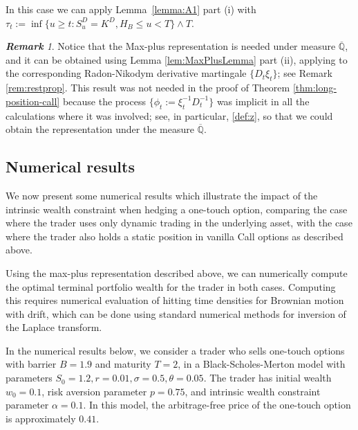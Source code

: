 \documentclass[a4paper]{amsart}
\theoremstyle{definition}
\theoremstyle{remark}
\newtheorem{remark}[theorem]{\textbf{Remark}}
\numberwithin{equation}{section}
\newcommand{\ol}{\overline}
\newcommand{\bQ}{\ol{\mathbb{Q}}}
\begin{document}
In this case we can apply Lemma~\ref{lemma:A1} part (i) with $\tau_t := \inf\{u \ge t : S_u^D = K^D, H_B \le u < T\} \wedge T$.

 \begin{remark}
Notice that  the Max-plus representation is needed  under measure $\bQ$, and it can be obtained using Lemma \ref{lem:MaxPlusLemma} part (ii), applying to the corresponding Radon-Nikodym derivative martingale $\{D_t\xi_t\}$; see Remark \ref{rem:restprop}. This result was not needed in the proof of Theorem \ref{thm:long-position-call}
because the process $\{\phi_t := \xi_t^{-1} D_t^{-1}\}$ was implicit in all the calculations where it was involved; see, in particular,  \ref{def:z}, so that we could obtain the representation under  the measure  $\bQ$.
 
\end{remark}


 


\subsection{Numerical results}

We now present some numerical results which illustrate the impact of the intrinsic wealth constraint when hedging a one-touch option, comparing the case where the trader uses only dynamic trading in the underlying asset, with the case where the trader also holds a static position in vanilla Call options as described above.

Using the max-plus representation described above, we can numerically compute the optimal terminal portfolio wealth for the trader in both cases. Computing this requires numerical evaluation of hitting time densities for Brownian motion with drift, which can be done using standard numerical methods for inversion of the Laplace transform. 

In the numerical results below, we consider a trader who sells one-touch options with barrier $B=1.9$ and maturity $T=2$, in a Black-Scholes-Merton model with parameters $S_0=1.2, r=0.01, \sigma=0.5, \theta = 0.05$. The trader has initial wealth $w_0=0.1$, risk aversion parameter $p=0.75$, and intrinsic wealth constraint parameter $\alpha=0.1$. In this model, the arbitrage-free price of the one-touch option is approximately $0.41$.
\end{document}
